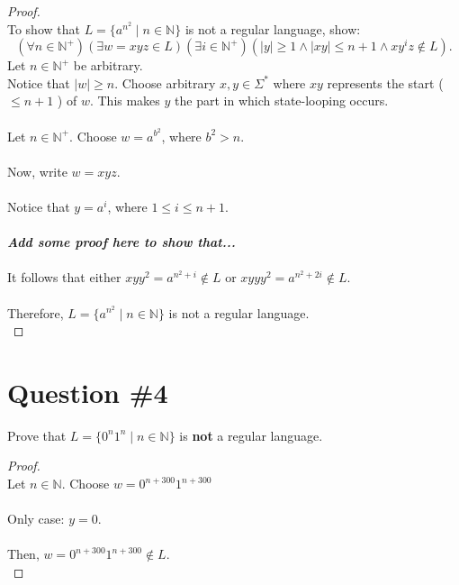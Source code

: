 \documentclass[12pt]{article}
\begin{document}
\begin{proof}
\leavevmode\\
    To show that \( L = \{ a^{n^2} \mid n \in \mathbb{N} \} \) is not a regular language, show:
    \[
        (\forall n \in \mathbb{N}^+)(\exists w = xyz \in L)(\exists i \in \mathbb{N}^+)(|y| \geq 1 \land |xy| \leq n + 1 \land xy^iz \notin L) \text{.}
    \]
    Let \( n \in \mathbb{N}^+ \) be arbitrary. \\
    Notice that \( |w| \geq n \). Choose arbitrary \( x, y \in \Sigma^* \) where \( xy \) represents the start (\( \leq n + 1 \) ) of \( w \). This makes \( y \) the part in which state-looping occurs. \\
    \\
    Let \( n \in \mathbb{N}^+ \). Choose \( w = a^{b^2} \), where \( b^2 > n \). \\
    \\
    Now, write \( w = xyz \). \\
    \\
    Notice that \( y = a^i \), where \( 1 \leq  i \leq  n + 1 \). \\
    \\
    \textbf{\textit{Add some proof here to show that...}} \\
    \\
    It follows that either \( xyy^2 = a^{n^2 + i} \notin L \) or \( xyyy^2 = a^{n^2 + 2i} \notin L \). \\
    \\
    Therefore, \( L = \{ a^{n^2} \mid n \in \mathbb{N} \} \) is not a regular language. \\
\end{proof}
\pagebreak

\section*{Question \#4}
Prove that \( L = \{ 0^n1^n \mid n \in \mathbb{N} \} \) is \textbf{not} a regular language.\begin{proof}
\leavevmode\\
    Let \( n \in \mathbb{N} \). Choose \( w = 0^{n + 300}1^{n + 300} \) \\
    \\
    Only case: \( y = 0 \). \\
    \\
    Then, \( w = 0^{n + 300}1^{n + 300} \notin L \). \\
\end{proof}
\pagebreak
\end{document}
